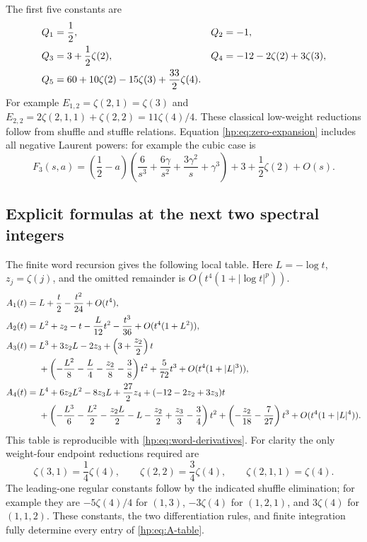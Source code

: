 \documentclass[11pt,a4paper]{article}
\numberwithin{equation}{section}
\theoremstyle{definition}
\theoremstyle{remark}
\begin{document}
The first five constants are
\begin{align}\label{hp:eq:Q-table}
 Q_1&=\frac12,& Q_2&=-1,\notag\\
 Q_3&=3+\frac12\zeta(2),&
 Q_4&=-12-2\zeta(2)+3\zeta(3),\notag\\
 Q_5&=60+10\zeta(2)-15\zeta(3)+\frac{33}{2}\zeta(4).
\end{align}
For example $E_{1,2}=\zeta(2,1)=\zeta(3)$ and
$E_{2,2}=2\zeta(2,1,1)+\zeta(2,2)=11\zeta(4)/4$.
These classical low-weight reductions follow from shuffle and stuffle
relations. Equation \eqref{hp:eq:zero-expansion} includes all negative
Laurent powers: for example the cubic case is
\[
 F_3(s,a)=\left(\frac12-a\right)
 \left(\frac6{s^3}+\frac{6\gamma}{s^2}+
                    \frac{3\gamma^2}{s}+\gamma^3\right)
         +3+\frac12\zeta(2)+O(s).
\]

\subsection{Explicit formulas at the next two spectral integers}

The finite word recursion gives the following local table. Here
$L=-\log t$, $z_j=\zeta(j)$, and the omitted remainder is
$O(t^4(1+|\log t|^p))$.
\begin{align}\label{hp:eq:A-table}
 A_1(t)={}&L+\frac t2-\frac{t^2}{24}+O(t^4),\notag\\
 A_2(t)={}&L^2+z_2-t-\frac{L}{12}t^2-\frac{t^3}{36}
                         +O(t^4(1+L^2)),\notag\\
 A_3(t)={}&L^3+3z_2L-2z_3+\left(3+\frac{z_2}{2}\right)t\notag\\
 &+\left(-\frac{L^2}{8}-\frac L4-\frac{z_2}{8}-\frac38\right)t^2
           +\frac5{72}t^3+O(t^4(1+|L|^3)),\notag\\
 A_4(t)={}&L^4+6z_2L^2-8z_3L+\frac{27}{2}z_4
             +(-12-2z_2+3z_3)t\notag\\
 &+\left(-\frac{L^3}{6}-\frac{L^2}{2}-\frac{z_2L}{2}-L
                 -\frac{z_2}{2}+\frac{z_3}{3}-\frac34\right)t^2
      +\left(-\frac{z_2}{18}-\frac7{27}\right)t^3
                     +O(t^4(1+|L|^4)).
\end{align}
This table is reproducible with \eqref{hp:eq:word-derivatives}.
For clarity the only weight-four endpoint reductions required are
\[
 \zeta(3,1)=\frac14\zeta(4),\qquad
 \zeta(2,2)=\frac34\zeta(4),\qquad
 \zeta(2,1,1)=\zeta(4).
\]
The leading-one regular constants follow by the indicated shuffle
elimination; for example they are $-5\zeta(4)/4$ for $(1,3)$,
$-3\zeta(4)$ for $(1,2,1)$, and $3\zeta(4)$ for $(1,1,2)$.
These constants, the two differentiation rules, and finite integration
fully determine every entry of \eqref{hp:eq:A-table}.
\end{document}
